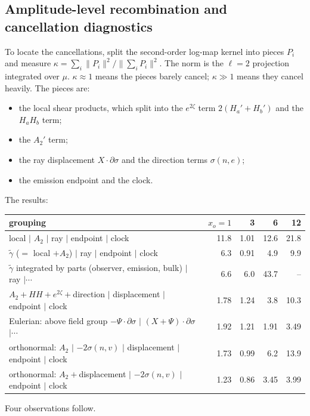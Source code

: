 \subsection{Amplitude-level recombination and cancellation diagnostics}
To locate the cancellations, split the second-order log-map kernel into pieces $P_i$ and
measure $\kappa=\sum_i\|P_i\|^2/\|\sum_iP_i\|^2$. The norm is the $\ell=2$ projection integrated
over $\mu$. $\kappa\approx1$ means the pieces barely cancel; $\kappa\gg1$ means they cancel
heavily. The pieces are:
\begin{itemize}
\item the local shear products, which split into the $e^{2\zeta}$ term $2(H_a'+H_b')$ and
  the $H_aH_b$ term;
\item the $A_2'$ term;
\item the ray displacement $X\cdot\partial\sigma$ and the direction terms $\sigma(n,e)$;
\item the emission endpoint and the clock.
\end{itemize}
The results:
\begin{center}
\begin{tabular}{lrrrr}
\toprule
grouping & $x_o=1$ & 3 & 6 & 12\\\midrule
local $|$ $A_2$ $|$ ray $|$ endpoint $|$ clock & 11.8 & 1.01 & 12.6 & 21.8\\
$\tilde\gamma$ ($=$ local $+A_2$) $|$ ray $|$ endpoint $|$ clock & 6.3 & 0.91 & 4.9 & 9.9\\
$\tilde\gamma$ integrated by parts (observer, emission, bulk) $|$ ray $|\cdots$ & 6.6 & 6.0 & 43.7 & --\\
$A_2+HH+e^{2\zeta}+$direction $|$ displacement $|$ endpoint $|$ clock & 1.78 & 1.24 & 3.8 & 10.3\\
Eulerian: above field group $-\Psi\cdot\partial\sigma$ $|$ $(X+\Psi)\cdot\partial\sigma$ $|\cdots$ & 1.92 & 1.21 & 1.91 & 3.49\\
orthonormal: $A_2$ $|$ $-2\sigma(n,v)$ $|$ displacement $|$ endpoint $|$ clock & 1.73 & 0.99 & 6.2 & 13.9\\
orthonormal: $A_2+$displacement $|$ $-2\sigma(n,v)$ $|$ endpoint $|$ clock & 1.23 & 0.86 & 3.45 & 3.99\\
\bottomrule
\end{tabular}
\end{center}
Four observations follow.
